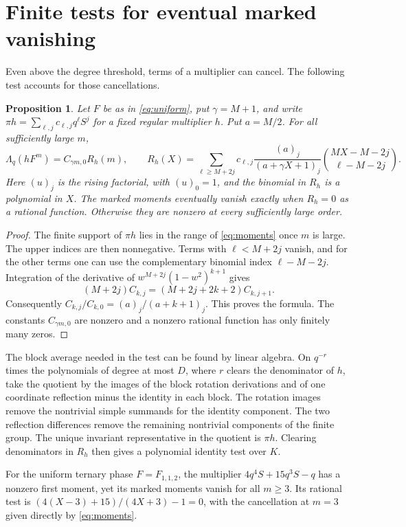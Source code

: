 \documentclass[11pt]{article}
\newtheorem{proposition}[theorem]{Proposition}
\newcommand{\Lq}{\Lambda_q}
\begin{document}
\section{Finite tests for eventual marked vanishing}\label{sec:tail}

Even above the degree threshold, terms of a multiplier can cancel.
The following test accounts for those cancellations.

\begin{proposition}\label{prop:tail}
Let \(F\) be as in \eqref{eq:uniform}, put \(\gamma=M+1\), and
write \(\pi h=\sum_{\ell,j}c_{\ell,j}q^\ell S^j\) for a fixed
regular multiplier \(h\). Put \(a=M/2\). For all sufficiently large \(m\),
\[
  \Lq(hF^m)=C_{\gamma m,0}R_h(m),\qquad
  R_h(X)=
    \sum_{\ell\ge M+2j} c_{\ell,j}
    \frac{(a)_j}{(a+\gamma X+1)_j}
    \binom{MX-M-2j}{\ell-M-2j}.
\]
Here \((u)_j\) is the rising factorial, with \((u)_0=1\), and the
binomial in \(R_h\) is a polynomial in \(X\).
The marked moments eventually vanish exactly when \(R_h=0\)
as a rational function. Otherwise they are nonzero at every
sufficiently large order.
\end{proposition}

\begin{proof}
The finite support of \(\pi h\) lies in the range of
\eqref{eq:moments} once \(m\) is large. The upper indices are then
nonnegative. Terms with \(\ell<M+2j\) vanish, and for the other terms
one can use the complementary binomial index \(\ell-M-2j\).
Integration of the derivative of \(w^{M+2j}(1-w^2)^{k+1}\) gives
\[
 (M+2j)C_{k,j}=(M+2j+2k+2)C_{k,j+1}.
\]
Consequently \(C_{k,j}/C_{k,0}=(a)_j/(a+k+1)_j\).
This proves the formula. The constants \(C_{\gamma m,0}\) are
nonzero and a nonzero rational function has only finitely many zeros.
\end{proof}

The block average needed in the test can be found by linear algebra.
On \(q^{-r}\) times the polynomials of degree at most \(D\), where
\(r\) clears the denominator of \(h\), take the quotient by the images
of the block rotation derivations and of one coordinate reflection
minus the identity in each block. The rotation images remove the
nontrivial simple summands for the identity component. The two
reflection differences remove the remaining nontrivial components
of the finite group. The unique invariant representative in the
quotient is \(\pi h\). Clearing denominators in \(R_h\) then gives
a polynomial identity test over \(K\).

For the uniform ternary phase \(F=F_{1,1,2}\), the multiplier
\(4q^4S+15q^3S-q\) has a nonzero first moment, yet its marked moments
vanish for all \(m\ge3\). Its rational test is
\((4(X-3)+15)/(4X+3)-1=0\), with the cancellation at \(m=3\)
given directly by \eqref{eq:moments}.
\end{document}
